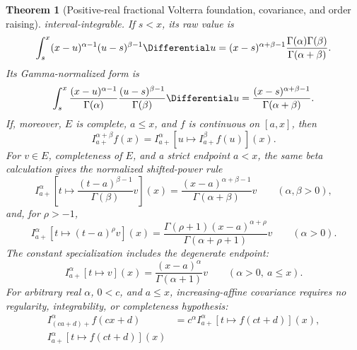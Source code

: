 \documentclass[11pt,oneside]{article}
\newtheorem{theorem}{Theorem}[section]
\theoremstyle{definition}
\theoremstyle{remark}
\begin{document}
\begin{theorem}[Positive-real fractional Volterra foundation, covariance, and order raising]
interval-integrable.  If \(s<x\), its raw value is
\begin{equation}
 \int_s^x(x-u)^{\alpha-1}(u-s)^{\beta-1}\Differential u
 =(x-s)^{\alpha+\beta-1}
   \frac{\Gamma(\alpha)\Gamma(\beta)}{\Gamma(\alpha+\beta)}.
 \label{eq:fractional-volterra-beta-kernel}
\end{equation}
Its Gamma-normalized form is
\begin{equation}
 \int_s^x
 \frac{(x-u)^{\alpha-1}}{\Gamma(\alpha)}
 \frac{(u-s)^{\beta-1}}{\Gamma(\beta)}\Differential u
 =\frac{(x-s)^{\alpha+\beta-1}}{\Gamma(\alpha+\beta)}.
 \label{eq:fractional-volterra-normalized-beta-kernel}
\end{equation}
If, moreover, \(E\) is complete, \(a\le x\), and \(f\) is continuous on
\([a,x]\), then
\begin{equation}
 I_{a+}^{\alpha+\beta}f(x)
 =I_{a+}^{\alpha}\!\left[u\mapsto I_{a+}^{\beta}f(u)\right](x).
 \label{eq:fractional-volterra-semigroup}
\end{equation}
For \(v\in E\), completeness of \(E\), and a strict endpoint \(a<x\), the same
beta calculation gives the normalized shifted-power rule
\begin{equation}
 I_{a+}^{\alpha}\!\left[t\mapsto
   \frac{(t-a)^{\beta-1}}{\Gamma(\beta)}v\right](x)
 =\frac{(x-a)^{\alpha+\beta-1}}{\Gamma(\alpha+\beta)}v
 \qquad(\alpha,\beta>0),
 \label{eq:fractional-volterra-normalized-rpow}
\end{equation}
and, for \(\rho>-1\),
\begin{equation}
 I_{a+}^{\alpha}\!\left[t\mapsto(t-a)^\rho v\right](x)
 =\frac{\Gamma(\rho+1)(x-a)^{\alpha+\rho}}
        {\Gamma(\alpha+\rho+1)}v
 \qquad(\alpha>0).
 \label{eq:fractional-volterra-rpow}
\end{equation}
The constant specialization includes the degenerate endpoint:
\begin{equation}
 I_{a+}^{\alpha}[t\mapsto v](x)
 =\frac{(x-a)^\alpha}{\Gamma(\alpha+1)}v
 \qquad(\alpha>0,\ a\le x).
 \label{eq:fractional-volterra-const}
\end{equation}
For arbitrary real \(\alpha\), \(0<c\), and \(a\le x\), increasing-affine covariance
requires no regularity, integrability, or completeness hypothesis:
\begin{align}
 I_{(ca+d)+}^{\alpha}f(cx+d)
 &=c^{\alpha}I_{a+}^{\alpha}[t\mapsto f(ct+d)](x),
                                                               \label{eq:fractional-volterra-affine}\\
 I_{a+}^{\alpha}[t\mapsto f(ct+d)](x)

\end{align}
\end{theorem}
\end{document}
